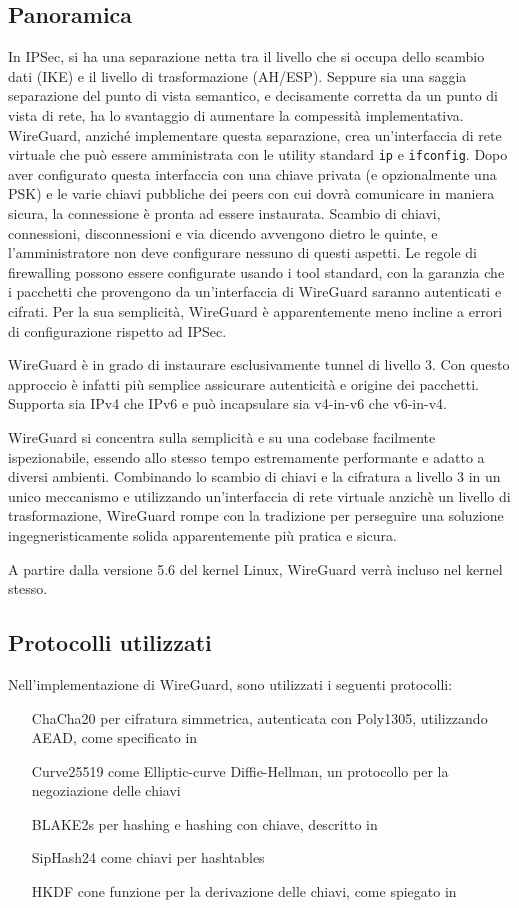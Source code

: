 \subsection{Panoramica}
In IPSec, si ha una separazione netta tra il livello che si occupa dello scambio dati (IKE) e il livello di trasformazione (AH/ESP). Seppure sia una saggia separazione del punto di vista semantico, e decisamente corretta da un punto di vista di rete, ha lo svantaggio di aumentare la compessità implementativa.
WireGuard, anziché implementare questa separazione, crea un'interfaccia di rete virtuale che può essere amministrata con le utility standard \texttt{ip} e \texttt{ifconfig}. Dopo aver configurato questa interfaccia con una chiave privata (e opzionalmente una PSK) e le varie chiavi pubbliche dei peers con cui dovrà comunicare in maniera sicura, la connessione è pronta ad essere instaurata. Scambio di chiavi, connessioni, disconnessioni e via dicendo avvengono dietro le quinte, e l'amministratore non deve configurare nessuno di questi aspetti.
Le regole di firewalling possono essere configurate usando i tool standard, con la garanzia che i pacchetti che provengono da un'interfaccia di WireGuard saranno autenticati e cifrati. Per la sua semplicità, WireGuard è apparentemente meno incline a errori di configurazione rispetto ad IPSec.

WireGuard è in grado di instaurare esclusivamente tunnel di livello 3. Con questo approccio è infatti più semplice assicurare autenticità e origine dei pacchetti. Supporta sia IPv4 che IPv6 e può incapsulare sia v4-in-v6 che v6-in-v4.

WireGuard si concentra sulla semplicità e su una codebase facilmente ispezionabile, essendo allo stesso tempo estremamente performante e adatto a diversi ambienti. Combinando lo scambio di chiavi e la cifratura a livello 3 in un unico meccanismo e utilizzando un'interfaccia di rete virtuale anzichè un livello di trasformazione, WireGuard rompe con la tradizione per perseguire una soluzione ingegneristicamente solida apparentemente più pratica e sicura.

A partire dalla versione 5.6 del kernel Linux, WireGuard verrà incluso nel kernel stesso. 
\subsection{Protocolli utilizzati}
Nell'implementazione di WireGuard, sono utilizzati i seguenti protocolli:
\begin{itemize}
    \item[ChaCha20] per cifratura simmetrica, autenticata con Poly1305, utilizzando AEAD, come specificato in \cite[RFC7539]{RFC7539}
    \item[Curve25519] come Elliptic-curve Diffie-Hellman, un protocollo per la negoziazione delle chiavi
    \item[BLAKE2s] per hashing e hashing con chiave, descritto in \cite[RFC7693]{RFC7693}
    \item[SipHash24] come chiavi per hashtables
    \item[HKDF] cone funzione per la derivazione delle chiavi, come spiegato in \cite[RFC5869]{RFC5869}
\end{itemize}

